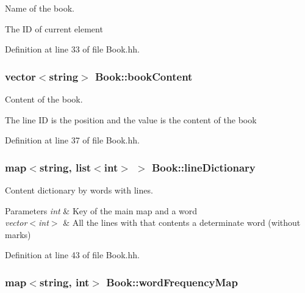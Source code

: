 Name of the book. 

The ID of current element 

Definition at line 33 of file Book.\+hh.

\subsubsection[{\texorpdfstring{book\+Content}{bookContent}}]{\setlength{\rightskip}{0pt plus 5cm}vector$<$string$>$ Book\+::book\+Content\hspace{0.3cm}{\ttfamily [private]}}\hypertarget{class_book_a62ca3f4431b699fa41384c8bab7ef4fa}{}\label{class_book_a62ca3f4431b699fa41384c8bab7ef4fa}


Content of the book. 

The line ID is the position and the value is the content of the book 

Definition at line 37 of file Book.\+hh.

\subsubsection[{\texorpdfstring{line\+Dictionary}{lineDictionary}}]{\setlength{\rightskip}{0pt plus 5cm}map$<$string, list$<$int$>$ $>$ Book\+::line\+Dictionary\hspace{0.3cm}{\ttfamily [private]}}\hypertarget{class_book_a7da5c2f5239458c2ab88576cac8d0a10}{}\label{class_book_a7da5c2f5239458c2ab88576cac8d0a10}


Content dictionary by words with lines. 


\begin{DoxyParams}{Parameters}
{\em int} & Key of the main map and a word \\
\hline
{\em vector$<$int$>$} & All the lines with that contents a determinate word (without marks) \\
\hline
\end{DoxyParams}


Definition at line 43 of file Book.\+hh.

\subsubsection[{\texorpdfstring{word\+Frequency\+Map}{wordFrequencyMap}}]{\setlength{\rightskip}{0pt plus 5cm}map$<$string, int$>$ Book\+::word\+Frequency\+Map\hspace{0.3cm}{\ttfamily [private]}}\hypertarget{class_book_a18b73c8d2b492cad5b7b0c187b08dfc0}{}\label{class_book_a18b73c8d2b492cad5b7b0c187b08dfc0}


